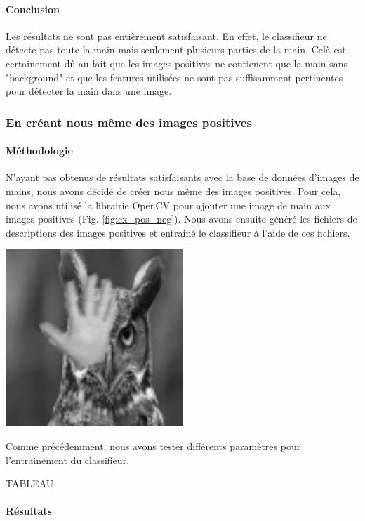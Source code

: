 \documentclass[11pt]{article}
\begin{document}
\paragraph{Conclusion}
Les résultats ne sont pas entièrement satisfaisant. En effet, le classifieur ne détecte pas toute la main mais seulement plusieurs parties de la main. Celà est certainement dû au fait que les images positives ne contienent que la main sans "background" et que les features utilisées ne sont pas suffisamment pertinentes pour détecter la main dans une image. \bigbreak

\subsubsection{En créant nous même des images positives}
\paragraph{Méthodologie}
N'ayant pas obtenus de résultats satisfaisants avec la base de données d'images de mains, nous avons décidé de créer nous même des images positives. Pour cela, nous avons utilisé la librairie OpenCV pour ajouter une image de main aux images positives (Fig. \ref{fig:ex_pos_neg}). Nous avons ensuite généré les fichiers de descriptions des images positives et entrainé le classifieur à l'aide de ces fichiers. \bigbreak

\begin{center}
    \includegraphics[width=0.5\textwidth]{images/ex_pos_neg.jpg}
    \label{fig:ex_pos_neg}
\end{center}

Comme précédemment, nous avons tester différents paramètres pour l'entrainement du classifieur. \bigbreak

{\LARGE TABLEAU}
\paragraph{Résultats}
\end{document}
